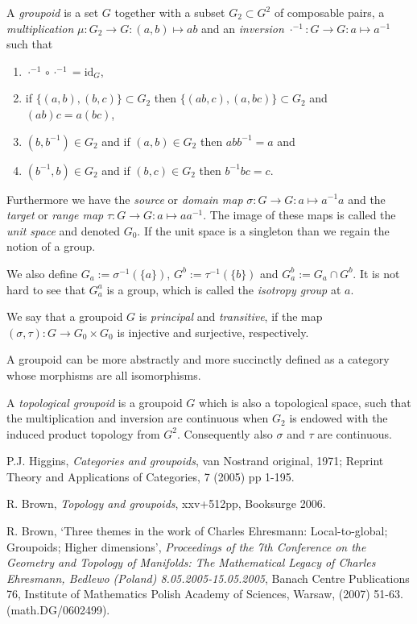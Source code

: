 \documentclass[12pt]{article}
\begin{document}
A \emph{groupoid} is a set $G$ together with a subset $G_2 \subset G^2$ of composable pairs, a \emph{multiplication} $\mu : G_2 \to G : (a, b) \mapsto ab$ and an \emph{inversion} $\cdot ^{-1} : G \to G : a \mapsto a^{-1}$ such that

\begin{enumerate}
\item $\cdot^{-1} \circ \cdot^{-1} = \mathrm{id}_G$,
\item if $\{(a, b), (b, c)\} \subset G_2$ then $\{(ab, c), (a, bc)\} \subset G_2$ and $(ab)c = a(bc)$,
\item $(b, b^{-1}) \in G_2$ and if $(a, b) \in G_2$ then $abb^{-1} = a$ and
\item $(b^{-1}, b) \in G_2$ and if $(b, c) \in G_2$ then $b^{-1}bc = c$.
\end{enumerate}

Furthermore we have the \emph{source} or \emph{domain map} $\sigma : G \to G : a \mapsto a^{-1}a$ and the \emph{target} or \emph{range map} $\tau : G \to G : a \mapsto aa^{-1}$. The image of these maps is called the \emph{unit space} and denoted $G_0$. If the unit space is a singleton than we regain the notion of a group.

We also define $G_a := \sigma^{-1}(\{a\})$, $G^b := \tau^{-1}(\{b\})$ and $G_a^b := G_a \cap G^b$. It is not hard to see that $G_a^a$ is a group, which is called the \emph{isotropy group} at $a$.

We say that a groupoid $G$ is \emph{principal} and \emph{transitive}, if the map $(\sigma, \tau) : G \to G_0 \times G_0$ is injective and surjective, respectively.

A groupoid can be more abstractly and more succinctly defined as a category whose morphisms are all isomorphisms.

A \emph{topological groupoid} is a groupoid $G$ which is also a topological space, such that the multiplication and inversion are continuous when $G_2$ is endowed with the induced product topology from $G^2$. Consequently also $\sigma$ and $\tau$ are continuous.

\begin{thebibliography}{9}
 P.J. Higgins, {\it Categories and groupoids}, van Nostrand original, 1971; Reprint 
Theory and Applications of Categories,  7 (2005) pp 1-195. 

 R. Brown, {\it Topology and groupoids}, xxv+512pp, Booksurge 2006. 

 R. Brown,  `Three themes in the work of Charles Ehresmann:
Local-to-global; Groupoids; Higher dimensions', {\it Proceedings of the
7th Conference on the Geometry and Topology of Manifolds: The
Mathematical Legacy of Charles   Ehresmann, Bedlewo (Poland)
8.05.2005-15.05.2005}, Banach Centre Publications 76, Institute of
Mathematics Polish Academy of Sciences, Warsaw, (2007) 51-63.
(math.DG/0602499).

\end{thebibliography}
\end{document}
